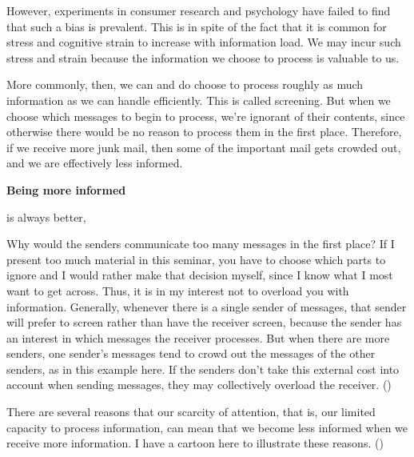 However, experiments in consumer research and psychology have failed to find
that such a bias is prevalent. This is in spite of the fact that it is common
for stress and cognitive strain to increase with information load. We may
incur such stress and strain because the information we choose to process is
valuable to us.

More commonly, then, we can and do choose to process roughly as much
information as we can handle efficiently. This is called screening. But when
we choose which messages to begin to process, we're ignorant of their
contents, since otherwise there would be no reason to process them in the
first place. Therefore, if we receive more junk mail, then some of the
important mail gets crowded out, and we are effectively less informed.

\begin{slide} \label{informed}
\begin{center}
  {\bf Being more informed} \par
    \smallskip
  is always better,\par
    \medskip
\end{center}
\end{slide}

  Why would the senders communicate too many messages in the first place? If I
present too much material in this seminar, you have to choose which parts to
ignore and I would rather make that decision myself, since I know what I most
want to get across. Thus, it is in my interest not to overload you with
information. Generally, whenever there is a single sender of messages, that
sender will prefer to screen rather than have the receiver screen, because the
sender has an interest in which messages the receiver processes.
But when there are more senders, one sender's  messages tend to crowd out the
messages of the other senders, as in this example here. If the senders don't
take this external cost into account when sending messages, they may
collectively overload the receiver. ()

There are several reasons that our scarcity of attention, that is, our limited
capacity to process information, can mean that we become less informed when we
receive  more information. I have a cartoon here to illustrate these reasons.
()

